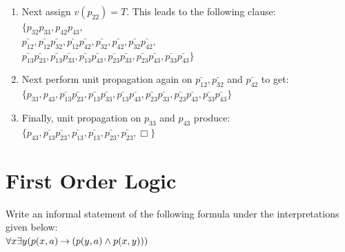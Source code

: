 \documentclass[]{exam}
\newcommand{\bb}[1]{\mathbb{#1}}
\newcommand{\N}{\bb{N}}
\begin{document}
\begin{questions}
\begin{parts}
\begin{solution}
\begin{enumerate}
\item Next assign $v(p_{22}) = T$. This leads to the following clause:\\
$\{ 
         p_{32}p_{33}, 
         p_{42}p_{43},$ \\
$\bar{p_{12}},
 \bar{p_{12}}\bar{p_{32}},
 \bar{p_{12}}\bar{p_{42}},
             \bar{p_{32}},
             \bar{p_{42}},
 \bar{p_{32}}\bar{p_{42}},$\\
$\bar{p_{13}}\bar{p_{23}},
 \bar{p_{13}}\bar{p_{33}},
 \bar{p_{13}}\bar{p_{43}},
 \bar{p_{23}}\bar{p_{33}},
 \bar{p_{23}}\bar{p_{43}},
 \bar{p_{33}}\bar{p_{43}}\}$ \\
\item Next perform unit propagation again on $\bar{p_{12}}, \bar{p_{32}}$ and
$\bar{p_{42}}$ to get:\\
$\{ 
               p_{33}, 
               p_{43},
 \bar{p_{13}}\bar{p_{23}},
 \bar{p_{13}}\bar{p_{33}},
 \bar{p_{13}}\bar{p_{43}},
 \bar{p_{23}}\bar{p_{33}},
 \bar{p_{23}}\bar{p_{43}},
 \bar{p_{33}}\bar{p_{43}}\}$ \\
\item Finally, unit propagation on $p_{33}$ and $p_{43}$ produce:\\
$\{ 
               p_{43},
 \bar{p_{13}}\bar{p_{23}},
 \bar{p_{13}}            ,
 \bar{p_{13}}            ,
 \bar{p_{23}}            ,
 \bar{p_{23}}            ,
             \Box       \}$ \\
\end{enumerate}
\end{solution}
\end{parts}
\section*{First Order Logic}
\question Write an informal statement of the following formula under the
interpretations given below:\\ 
$\forall x \exists y (p(x,a) \mathbin{\rightarrow} (p(y,a) \land p(x,y)))$
\end{questions}
\end{document}

